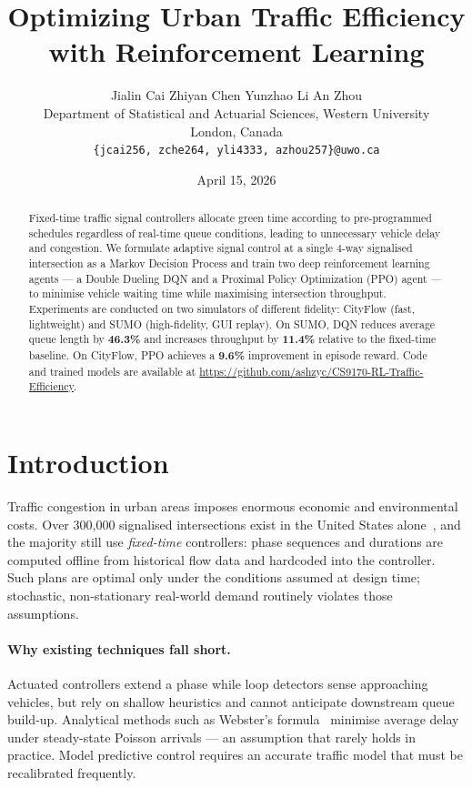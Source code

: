 \documentclass[10pt]{article}
\title{Optimizing Urban Traffic Efficiency with Reinforcement Learning}
\author{
  Jialin Cai \quad Zhiyan Chen \quad Yunzhao Li \quad An Zhou \\[4pt]
  Department of Statistical and Actuarial Sciences, Western University \\
  London, Canada \\
  \texttt{\{jcai256, zche264, yli4333, azhou257\}@uwo.ca}
}
\date{April 15, 2026}
\begin{document}
\maketitle

\begin{abstract}
Fixed-time traffic signal controllers allocate green time according to
pre-programmed schedules regardless of real-time queue conditions, leading to
unnecessary vehicle delay and congestion.  We formulate adaptive signal control
at a single 4-way signalised intersection as a Markov Decision Process and
train two deep reinforcement learning agents — a Double Dueling DQN and a
Proximal Policy Optimization (PPO) agent — to minimise vehicle waiting time
while maximising intersection throughput.  Experiments are conducted on two
simulators of different fidelity: CityFlow (fast, lightweight) and SUMO
(high-fidelity, GUI replay).  On SUMO, DQN reduces average queue length by
\textbf{46.3\%} and increases throughput by \textbf{11.4\%} relative to
the fixed-time baseline.  On CityFlow, PPO achieves a \textbf{9.6\%}
improvement in episode reward.  Code and trained models are available at
\url{https://github.com/ashzyc/CS9170-RL-Traffic-Efficiency}.
\end{abstract}

\section{Introduction}

Traffic congestion in urban areas imposes enormous economic and environmental
costs.  Over 300,000 signalised intersections exist in the United States
alone~\citep{schrank2021tti}, and the majority still use \emph{fixed-time}
controllers: phase sequences and durations are computed offline from historical
flow data and hardcoded into the controller.  Such plans are optimal only under
the conditions assumed at design time; stochastic, non-stationary real-world
demand routinely violates those assumptions.

\paragraph{Why existing techniques fall short.}
Actuated controllers extend a phase while loop detectors sense approaching
vehicles, but rely on shallow heuristics and cannot anticipate downstream queue
build-up.  Analytical methods such as Webster's formula~\citep{webster1958}
minimise average delay under steady-state Poisson arrivals — an assumption
that rarely holds in practice.  Model predictive control requires an accurate
traffic model that must be recalibrated frequently.
\end{document}
